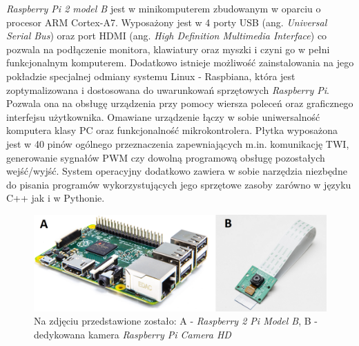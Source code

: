 \textit{Raspberry Pi 2 model B} jest w minikomputerem zbudowanym w oparciu o procesor ARM Cortex-A7. Wyposażony jest w 4 porty USB (ang. \textit{Universal Serial Bus}) oraz port HDMI (ang. \textit{High Definition Multimedia Interface}) co pozwala na podłączenie monitora, klawiatury oraz myszki i czyni go w pełni funkcjonalnym komputerem. Dodatkowo istnieje możliwość zainstalowania na jego pokładzie specjalnej odmiany systemu Linux - Raspbiana, która jest zoptymalizowana i dostosowana do uwarunkowań sprzętowych \textit{Raspberry Pi}. Pozwala ona na obsługę urządzenia przy pomocy wiersza poleceń oraz graficznego interfejsu użytkownika. Omawiane urządzenie łączy w sobie uniwersalność komputera klasy PC oraz funkcjonalność mikrokontrolera. Płytka wyposażona jest w 40 pinów ogólnego przeznaczenia zapewniających m.in. komunikację TWI, generowanie sygnałów PWM czy dowolną programową obsługę pozostałych wejść/wyjść. System operacyjny dodatkowo zawiera w sobie narzędzia niezbędne do pisania programów wykorzystujących jego sprzętowe zasoby zarówno w języku C++ jak i w Pythonie. 

\begin{figure}[H]
    \begin{center}
      \includegraphics[scale=0.3]{imgs/raspberry_pi.png}
 	\caption[Raspberry Pi wraz z kamerą.]{\small{Na zdjęciu przedstawione zostało: A - \textit{Raspberry 2 Pi Model B}}\footnotemark \small{, B - dedykowana kamera \textit{Raspberry Pi Camera HD}}\footnotemark }
	\label{trans_TWI}
    \end{center}
  \end{figure}  


